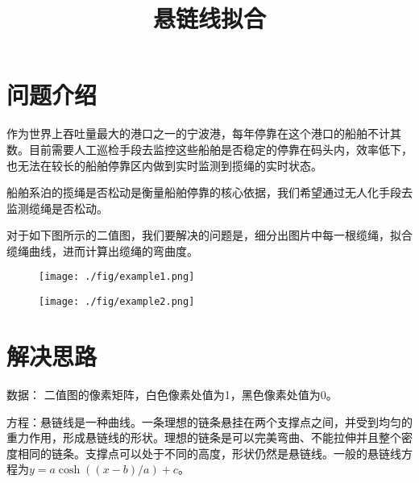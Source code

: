 \documentclass{article}
\title{悬链线拟合}
\author{}
\date{}
\begin{document}
\maketitle



\section{问题介绍}

作为世界上吞吐量最大的港口之一的宁波港，每年停靠在这个港口的船舶不计其数。目前需要人工巡检手段去监控这些船舶是否稳定的停靠在码头内，效率低下，也无法在较长的船舶停靠区内做到实时监测到揽绳的实时状态。

船舶系泊的揽绳是否松动是衡量船舶停靠的核心依据，我们希望通过无人化手段去监测缆绳是否松动。

对于如下图所示的二值图，我们要解决的问题是，细分出图片中每一根缆绳，拟合缆绳曲线，进而计算出缆绳的弯曲度。

\begin{figure}[H]
\begin{minipage}{0.48\linewidth}
  \centerline{\texttt{[image: ./fig/example1.png]}}
\end{minipage}
\hfill
\begin{minipage}{0.48\linewidth}
  \centerline{\texttt{[image: ./fig/example2.png]}}
\end{minipage}
\end{figure}


\section{解决思路}

数据： 二值图的像素矩阵，白色像素处值为1，黑色像素处值为0。

方程：悬链线是一种曲线。一条理想的链条悬挂在两个支撑点之间，并受到均匀的重力作用，形成悬链线的形状。理想的链条是可以完美弯曲、不能拉伸并且整个密度相同的链条。支撑点可以处于不同的高度，形状仍然是悬链线。一般的悬链线方程为\(y = a \cosh((x-b)/a) + c\)。
\end{document}
